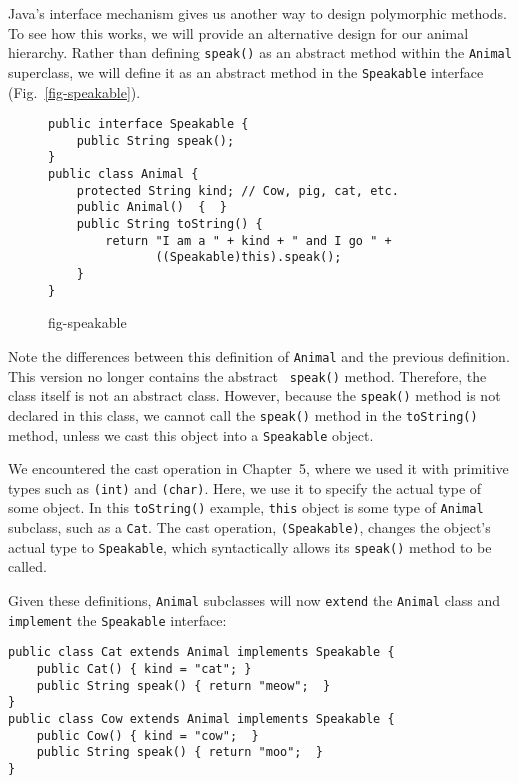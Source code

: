 Java's interface mechanism gives us another way to design polymorphic
methods. To see how this works, we will provide an alternative design
for our animal hierarchy. Rather than defining {\tt speak()} as an
abstract method within the {\tt Animal} superclass, we will define it
as an abstract method in the {\tt Speakable} interface
(Fig.~\ref{fig-speakable}).
\begin{figure}[h!]
\jjjprogstart
\begin{jjjlisting}
\begin{lstlisting}
public interface Speakable {
    public String speak();
}
public class Animal {
    protected String kind; // Cow, pig, cat, etc.
    public Animal()  {  }
    public String toString() {
        return "I am a " + kind + " and I go " + 
               ((Speakable)this).speak();
    }
}
\end{lstlisting}
\end{jjjlisting}
{fig-speakable}
\end{figure}

Note the differences between this definition of {\tt Animal} and the
previous definition. This version no longer contains the abstract {\tt
speak()} method. Therefore, the class itself is not an abstract class.
However, because the {\tt speak()} method is not declared in this
class, we cannot call the {\tt speak()} method in the {\tt toString()}
method, unless we cast this object into a {\tt Speakable} object.

We encountered the cast operation in Chapter~5, where we used it with
primitive types such as {\tt (int)} and {\tt (char)}.  Here, we use it
to specify the actual type of some object.  In this {\tt toString()}
example, {\tt this} object is some type of {\tt Animal} subclass, such
as a {\tt Cat}. The cast operation, {\tt (Speakable)}, changes the
object's actual type to {\tt Speakable}, which syntactically allows
its {\tt speak()} method to be called.

Given these definitions, {\tt Animal} subclasses will now {\tt extend}
the {\tt Animal} class and {\tt implement} the {\tt Speakable}
interface:

\begin{jjjlisting}
\begin{lstlisting}
public class Cat extends Animal implements Speakable {
    public Cat() { kind = "cat"; }
    public String speak() { return "meow";  }
}
public class Cow extends Animal implements Speakable {
    public Cow() { kind = "cow";  }
    public String speak() { return "moo";  }
}
\end{lstlisting}
\end{jjjlisting}

